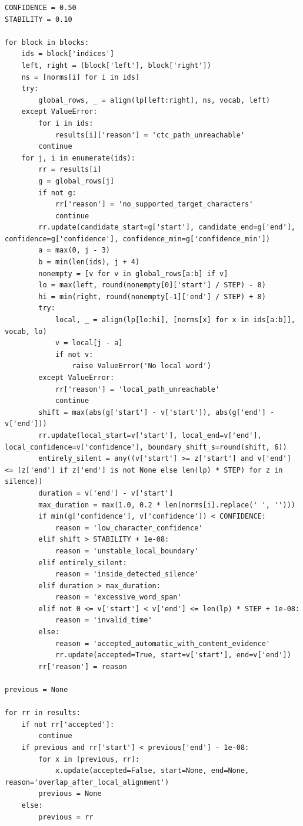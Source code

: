 \begin{lstlisting}
CONFIDENCE = 0.50
STABILITY = 0.10

for block in blocks:
    ids = block['indices']
    left, right = (block['left'], block['right'])
    ns = [norms[i] for i in ids]
    try:
        global_rows, _ = align(lp[left:right], ns, vocab, left)
    except ValueError:
        for i in ids:
            results[i]['reason'] = 'ctc_path_unreachable'
        continue
    for j, i in enumerate(ids):
        rr = results[i]
        g = global_rows[j]
        if not g:
            rr['reason'] = 'no_supported_target_characters'
            continue
        rr.update(candidate_start=g['start'], candidate_end=g['end'], confidence=g['confidence'], confidence_min=g['confidence_min'])
        a = max(0, j - 3)
        b = min(len(ids), j + 4)
        nonempty = [v for v in global_rows[a:b] if v]
        lo = max(left, round(nonempty[0]['start'] / STEP) - 8)
        hi = min(right, round(nonempty[-1]['end'] / STEP) + 8)
        try:
            local, _ = align(lp[lo:hi], [norms[x] for x in ids[a:b]], vocab, lo)
            v = local[j - a]
            if not v:
                raise ValueError('No local word')
        except ValueError:
            rr['reason'] = 'local_path_unreachable'
            continue
        shift = max(abs(g['start'] - v['start']), abs(g['end'] - v['end']))
        rr.update(local_start=v['start'], local_end=v['end'], local_confidence=v['confidence'], boundary_shift_s=round(shift, 6))
        entirely_silent = any((v['start'] >= z['start'] and v['end'] <= (z['end'] if z['end'] is not None else len(lp) * STEP) for z in silence))
        duration = v['end'] - v['start']
        max_duration = max(1.0, 0.2 * len(norms[i].replace(' ', '')))
        if min(g['confidence'], v['confidence']) < CONFIDENCE:
            reason = 'low_character_confidence'
        elif shift > STABILITY + 1e-08:
            reason = 'unstable_local_boundary'
        elif entirely_silent:
            reason = 'inside_detected_silence'
        elif duration > max_duration:
            reason = 'excessive_word_span'
        elif not 0 <= v['start'] < v['end'] <= len(lp) * STEP + 1e-08:
            reason = 'invalid_time'
        else:
            reason = 'accepted_automatic_with_content_evidence'
            rr.update(accepted=True, start=v['start'], end=v['end'])
        rr['reason'] = reason

previous = None

for rr in results:
    if not rr['accepted']:
        continue
    if previous and rr['start'] < previous['end'] - 1e-08:
        for x in [previous, rr]:
            x.update(accepted=False, start=None, end=None, reason='overlap_after_local_alignment')
        previous = None
    else:
        previous = rr
\end{lstlisting}
